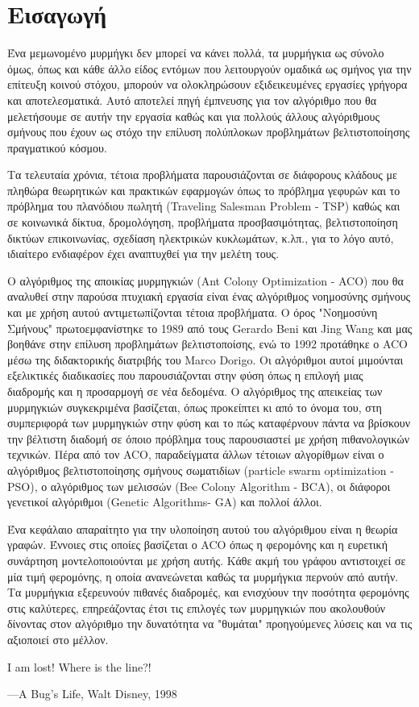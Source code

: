 \section{Εισαγωγή}
Ένα μεμωνομένο μυρμήγκι δεν μπορεί να κάνει πολλά, τα μυρμήγκια ως σύνολο όμως, όπως και κάθε άλλο είδος εντόμων που λειτουργούν ομαδικά ως σμήνος για την επίτευξη κοινού στόχου, μπορούν να ολοκληρώσουν εξιδεικευμένες εργασίες γρήγορα και αποτελεσματικά. Αυτό αποτελεί πηγή έμπνευσης για τον αλγόριθμο που θα μελετήσουμε σε αυτήν την εργασία καθώς και για πολλούς άλλους αλγόριθμους σμήνους που έχουν ως στόχο την επίλυση πολύπλοκων προβλημάτων βελτιστοποίησης πραγματικού κόσμου. \cite{dorigo2004ant} 

Τα τελευταία χρόνια, τέτοια προβλήματα παρουσιάζονται σε διάφορους κλάδους με πληθώρα θεωρητικών και πρακτικών εφαρμογών όπως το πρόβλημα γεφυρών και το πρόβλημα του πλανόδιου πωλητή (Traveling Salesman Problem - TSP) καθώς και σε κοινωνικά δίκτυα, δρομολόγηση, προβλήματα προσβασιμότητας, βελτιστοποίηση δικτύων επικοινωνίας, σχεδίαση ηλεκτρικών κυκλωμάτων, κ.λπ., για το λόγο αυτό, ιδιαίτερο ενδιαφέρον έχει αναπτυχθεί για την μελέτη τους. 

Ο αλγόριθμος της αποικίας μυρμηγκιών (Ant Colony Optimization - ACO) που θα αναλυθεί στην παρούσα πτυχιακή εργασία είναι ένας αλγόριθμος νοημοσύνης σμήνους και με χρήση αυτού αντιμετωπίζονται τέτοια προβλήματα. Ο όρος "Νοημοσύνη Σμήνους" πρωτοεμφανίστηκε το 1989 από τους Gerardo Beni και Jing Wang και μας βοηθάνε στην επίλυση προβλημάτων βελτιστοποίσης, ενώ το 1992 προτάθηκε ο ACO μέσω της διδακτορικής διατριβής του Marco Dorigo. Οι αλγόριθμοι αυτοί μιμούνται εξελικτικές διαδικασίες που παρουσιάζονται στην φύση όπως η επιλογή μιας διαδρομής και η προσαρμογή σε νέα δεδομένα. Ο αλγόριθμος της απεικείας των μυρμηγκιών συγκεκριμένα βασίζεται, όπως προκείπτει κι από το όνομα του, στη συμπεριφορά των μυρμηγκιών στην φύση και το πώς καταφέρνουν πάντα να βρίσκουν την βέλτιστη διαδομή σε όποιο πρόβλημα τους παρουσιαστεί με χρήση πιθανολογικών τεχνικών. Πέρα από τον ACO, παραδείγματα άλλων τέτοιων αλγορίθμων είναι ο αλγόριθμος βελτιστοποίησης σμήνους σωματιδίων (particle swarm optimization - PSO), ο αλγόριθμος των μελισσών (Bee Colony Algorithm - BCA), οι διάφοροι γενετικοί αλγόριθμοι (Genetic Algorithms- GA) και πολλοί άλλοι.

Ένα κεφάλαιο απαραίτητο για την υλοποίηση αυτού του αλγόριθμου είναι η θεωρία γραφών. Έννοιες στις οποίες βασίζεται ο ACO όπως η φερομόνης και η ευρετική συνάρτηση μοντελοποιούνται με χρήση αυτής. Κάθε ακμή του γράφου αντιστοιχεί σε μία τιμή φερομόνης, η οποία ανανεώνεται καθώς τα μυρμήγκια περνούν από αυτήν. Τα μυρμήγκια εξερευνούν πιθανές διαδρομές, και ενισχύουν την ποσότητα φερομόνης στις καλύτερες, επηρεάζοντας έτσι τις επιλογές των μυρμηγκιών που ακολουθούν δίνοντας στον αλγόριθμο την δυνατότητα να "θυμάται" προηγούμενες λύσεις και να τις αξιοποιεί στο μέλλον. 


\begin{flushright} 
    I am lost! Where is the line?!
    
    —A Bug’s Life, Walt Disney, 1998\cite{dorigo2004ant}
\end{flushright}



